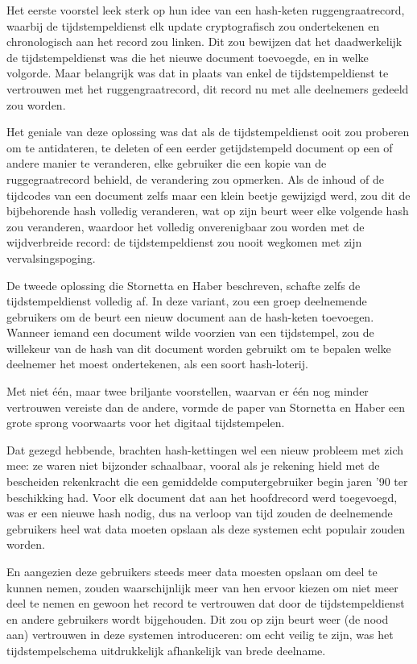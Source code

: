 \documentclass[
  a5paper,
  smalldemyvopaper,11pt,twoside,onecolumn,openright,extrafontsizes,
hidelinks]{memoir}
\begin{document}
Het eerste voorstel leek sterk op hun idee van een hash-keten
ruggengraatrecord, waarbij de tijdstempeldienst elk update
cryptografisch zou ondertekenen en chronologisch aan het record zou
linken. Dit zou bewijzen dat het daadwerkelijk de tijdstempeldienst was
die het nieuwe document toevoegde, en in welke volgorde. Maar belangrijk
was dat in plaats van enkel de tijdstempeldienst te vertrouwen met het
ruggengraatrecord, dit record nu met alle deelnemers gedeeld zou worden.

Het geniale van deze oplossing was dat als de tijdstempeldienst ooit zou
proberen om te antidateren, te deleten of een eerder getijdstempeld
document op een of andere manier te veranderen, elke gebruiker die een
kopie van de ruggegraatrecord behield, de verandering zou opmerken. Als
de inhoud of de tijdcodes van een document zelfs maar een klein beetje
gewijzigd werd, zou dit de bijbehorende hash volledig veranderen, wat op
zijn beurt weer elke volgende hash zou veranderen, waardoor het volledig
onverenigbaar zou worden met de wijdverbreide record: de
tijdstempeldienst zou nooit wegkomen met zijn vervalsingspoging.

De tweede oplossing die Stornetta en Haber beschreven, schafte zelfs de
tijdstempeldienst volledig af. In deze variant, zou een groep
deelnemende gebruikers om de beurt een nieuw document aan de hash-keten
toevoegen. Wanneer iemand een document wilde voorzien van een
tijdstempel, zou de willekeur van de hash van dit document worden
gebruikt om te bepalen welke deelnemer het moest ondertekenen, als een
soort hash-loterij.

Met niet één, maar twee briljante voorstellen, waarvan er één nog minder
vertrouwen vereiste dan de andere, vormde de paper van Stornetta en
Haber een grote sprong voorwaarts voor het digitaal tijdstempelen.

Dat gezegd hebbende, brachten hash-kettingen wel een nieuw probleem met
zich mee: ze waren niet bijzonder schaalbaar, vooral als je rekening
hield met de bescheiden rekenkracht die een gemiddelde computergebruiker
begin jaren '90 ter beschikking had. Voor elk document dat aan het
hoofdrecord werd toegevoegd, was er een nieuwe hash nodig, dus na
verloop van tijd zouden de deelnemende gebruikers heel wat data moeten
opslaan als deze systemen echt populair zouden worden.

En aangezien deze gebruikers steeds meer data moesten opslaan om deel te
kunnen nemen, zouden waarschijnlijk meer van hen ervoor kiezen om niet
meer deel te nemen en gewoon het record te vertrouwen dat door de
tijdstempeldienst en andere gebruikers wordt bijgehouden. Dit zou op
zijn beurt weer (de nood aan) vertrouwen in deze systemen introduceren:
om echt veilig te zijn, was het tijdstempelschema uitdrukkelijk
afhankelijk van brede deelname.
\end{document}
